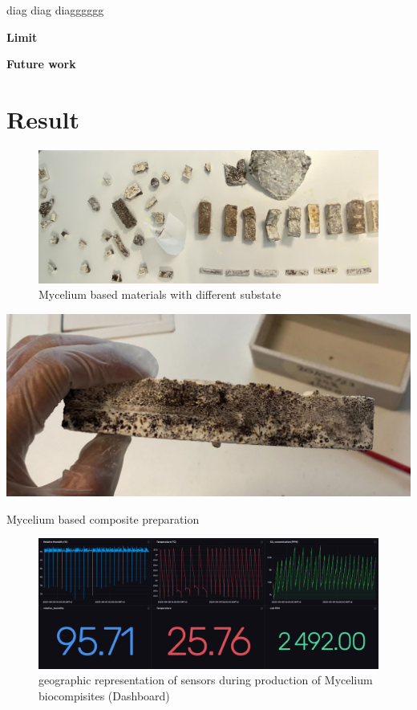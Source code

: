 diag diag diagggggg

\textbf{Limit}

\textbf{Future work}




















\section{Result}

\begin{figure}[h]
    \centering
    \includegraphics{images/resultMyce.png}
    \caption{Mycelium based materials with different substate}
    \label{fig:mycoproduction}
\end{figure} 

\begin{marginfigure}
    \centering
    \includegraphics{images/mycoillustration.png}
    \caption{Mycelium based composite preparation}
    \label{fig:illustration myco}
\end{marginfigure}


\begin{figure}[h]
    \centering
    \includegraphics[width=1.5\textwidth]{images/dashboard_all.png}
    \caption{geographic representation of sensors during production of Mycelium biocompisites (Dashboard)}
    \label{fig:dashboardbig}
\end{figure} 

